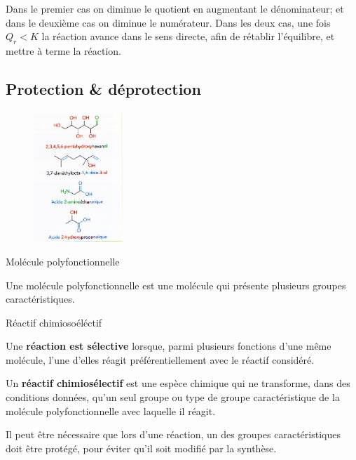 \documentclass[11pt,a4paper]{article}
\begin{document}
Dans le premier cas on diminue le quotient en augmentant le dénominateur; et dans le deuxième cas on diminue le numérateur. Dans les deux cas, une fois $Q_r<K$ la réaction avance dans le sens directe, afin de rétablir l'équilibre, et mettre à terme la réaction. 
\newpage
\subsection{Protection \& déprotection}
\begingroup
\begin{figure}
\centering
\includegraphics[width=0.3\textwidth]{imgs/c5/polyfonct1.jpg}
\end{figure}

\begin{defn}{Molécule polyfonctionnelle}

Une molécule polyfonctionnelle est une molécule qui présente plusieurs groupes caractéristiques.

\end{defn}
\vspace{1cm}
\begin{defn}{Réactif chimiosoéléctif}

Une \textbf{réaction est sélective} lorsque, parmi plusieurs fonctions d’une même molécule, l’une d’elles réagit préférentiellement avec le réactif considéré. 

Un \textbf{réactif chimiosélectif} est une espèce chimique qui ne transforme, dans des conditions données, qu’un seul groupe ou type de groupe caractéristique de la molécule polyfonctionnelle avec laquelle il réagit. 
\end{defn}
\vspace{0.5cm}

\endgroup

Il peut être nécessaire que lors d'une réaction, un des groupes caractéristiques doit être protégé, pour éviter qu'il soit modifié par la synthèse. 
\end{document}
